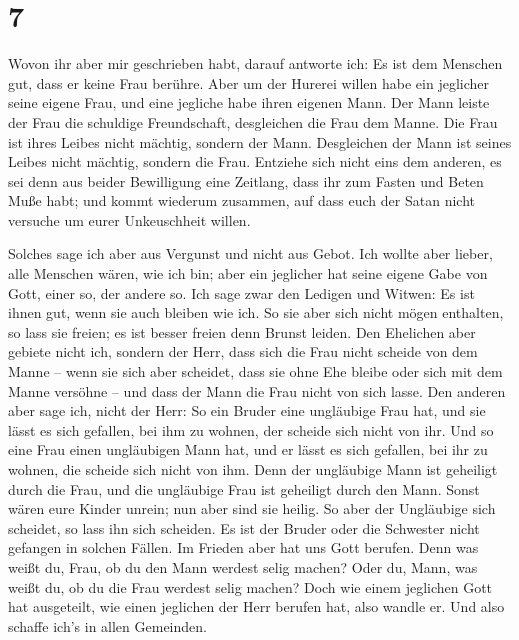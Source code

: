 \hypertarget{section-6}{%
\section{7}\label{section-6}}

 Wovon ihr aber mir geschrieben habt, darauf antworte ich:
Es ist dem Menschen gut, dass er keine Frau berühre.  Aber
um der Hurerei willen habe ein jeglicher seine eigene Frau, und eine
jegliche habe ihren eigenen Mann.  Der Mann leiste der
Frau die schuldige Freundschaft, desgleichen die Frau dem Manne.
 Die Frau ist ihres Leibes nicht mächtig, sondern der
Mann. Desgleichen der Mann ist seines Leibes nicht mächtig, sondern die
Frau.  Entziehe sich nicht eins dem anderen, es sei denn
aus beider Bewilligung eine Zeitlang, dass ihr zum Fasten und Beten Muße
habt; und kommt wiederum zusammen, auf dass euch der Satan nicht
versuche um eurer Unkeuschheit willen.

 Solches sage ich aber aus Vergunst und nicht aus Gebot.
 Ich wollte aber lieber, alle Menschen wären, wie ich bin;
aber ein jeglicher hat seine eigene Gabe von Gott, einer so, der andere
so.  Ich sage zwar den Ledigen und Witwen: Es ist ihnen
gut, wenn sie auch bleiben wie ich.  So sie aber sich
nicht mögen enthalten, so lass sie freien; es ist besser freien denn
Brunst leiden.  Den Ehelichen aber gebiete nicht ich,
sondern der Herr, dass sich die Frau nicht scheide von dem Manne --
 wenn sie sich aber scheidet, dass sie ohne Ehe bleibe
oder sich mit dem Manne versöhne -- und dass der Mann die Frau nicht von
sich lasse.  Den anderen aber sage ich, nicht der Herr:
So ein Bruder eine ungläubige Frau hat, und sie lässt es sich gefallen,
bei ihm zu wohnen, der scheide sich nicht von ihr.  Und
so eine Frau einen ungläubigen Mann hat, und er lässt es sich gefallen,
bei ihr zu wohnen, die scheide sich nicht von ihm.  Denn
der ungläubige Mann ist geheiligt durch die Frau, und die ungläubige
Frau ist geheiligt durch den Mann. Sonst wären eure Kinder unrein; nun
aber sind sie heilig.  So aber der Ungläubige sich
scheidet, so lass ihn sich scheiden. Es ist der Bruder oder die
Schwester nicht gefangen in solchen Fällen. Im Frieden aber hat uns Gott
berufen.  Denn was weißt du, Frau, ob du den Mann werdest
selig machen? Oder du, Mann, was weißt du, ob du die Frau werdest selig
machen?  Doch wie einem jeglichen Gott hat ausgeteilt,
wie einen jeglichen der Herr berufen hat, also wandle er. Und also
schaffe ich's in allen Gemeinden.

